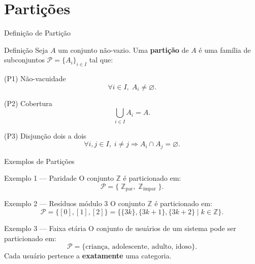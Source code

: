 \documentclass[9pt]{beamer}
\begin{document}
\section{Partições}

\begin{frame}{Definição de Partição}

\begin{block}{Definição}
Seja $A$ um conjunto não-vazio. Uma \textbf{partição} de $A$ é uma família de subconjuntos $\mathcal{P} = \{A_i\}_{i \in I}$ tal que:
\end{block}

\begin{block}{(P1) Não-vacuidade}    
\[
\forall i \in I,\; A_i \neq \varnothing.
\]
\end{block}

\begin{block}{(P2) Cobertura}
\[
\bigcup_{i \in I} A_i = A.
\]
\end{block}

\begin{block}{(P3) Disjunção dois a dois}
\[
\forall i,j \in I,\; i \neq j \Rightarrow A_i \cap A_j = \varnothing.
\]
\end{block}

\end{frame}

\begin{frame}{Exemplos de Partições}

\begin{block}{Exemplo 1 — Paridade}
O conjunto $\mathbb{Z}$ é particionado em:
\[
\mathcal{P} = \bigl\{\;\mathbb{Z}_{\text{par}},\;\mathbb{Z}_{\text{ímpar}}\;\bigr\}.
\]
\end{block}

\begin{block}{Exemplo 2 — Resíduos módulo 3}
O conjunto $\mathbb{Z}$ é particionado em:
\[
\mathcal{P} = \bigl\{[0],[1],[2]\bigr\} = \bigl\{\{3k\},\{3k+1\},\{3k+2\} \mid k \in \mathbb{Z}\bigr\}.
\]
\end{block}

\begin{block}{Exemplo 3 — Faixa etária}
O conjunto de usuários de um sistema pode ser particionado em:
\[
\mathcal{P} = \{\text{criança},\,\text{adolescente},\,\text{adulto},\,\text{idoso}\}.
\]
Cada usuário pertence a \textbf{exatamente} uma categoria.
\end{block}

\end{frame}
\end{document}
